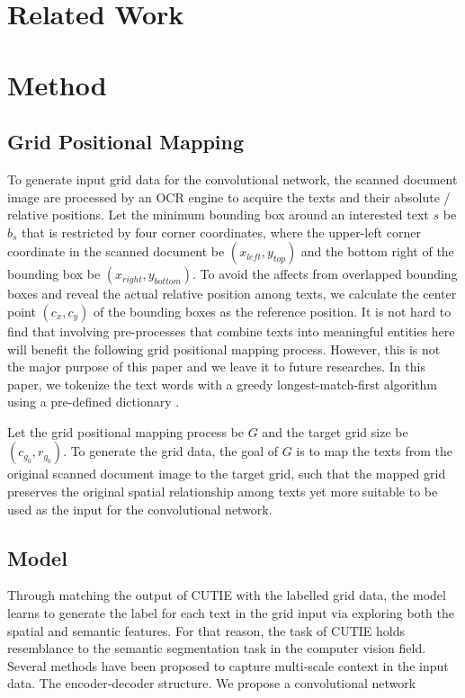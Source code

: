 \documentclass[10pt,twocolumn,letterpaper]{article}
\begin{document}
\section{Related Work}

\section{Method}
\subsection{Grid Positional Mapping}
To generate input grid data for the convolutional network, the scanned document image are processed by an OCR engine to acquire the texts and their absolute / relative positions. Let the minimum bounding box around an interested text $s$ be $b_s$ that is restricted by four corner coordinates, where the upper-left corner coordinate in the scanned document be $(x_{left}, y_{top})$ and the bottom right of the bounding box be $(x_{right}, y_{bottom})$. To avoid the affects from overlapped bounding boxes and reveal the actual relative position among texts, we calculate the center point $(c_x, c_y)$ of the bounding boxes as the reference position. It is not hard to find that involving pre-processes that combine texts into meaningful entities here will benefit the following grid positional mapping process. However, this is not the major purpose of this paper and we leave it to future researches. In this paper, we tokenize the text words with a greedy longest-match-first algorithm using a pre-defined dictionary \cite{bertgit}. 

Let the grid positional mapping process be $G$ and the target grid size be $(c_{g_0}, r_{g_0})$. To generate the grid data, the goal of $G$ is to map the texts from the original scanned document image to the target grid, such that the mapped grid preserves the original spatial relationship among texts yet more suitable to be used as the input for the convolutional network. 

\subsection{Model}
Through matching the output of CUTIE with the labelled grid data, the model learns to generate the label for each text in the grid input via exploring both the spatial and semantic features. For that reason, the task of CUTIE holds resemblance to the semantic segmentation task in the computer vision field. Several methods have been proposed to capture multi-scale context in the input data. The encoder-decoder structure. 
We propose a convolutional network
\end{document}
